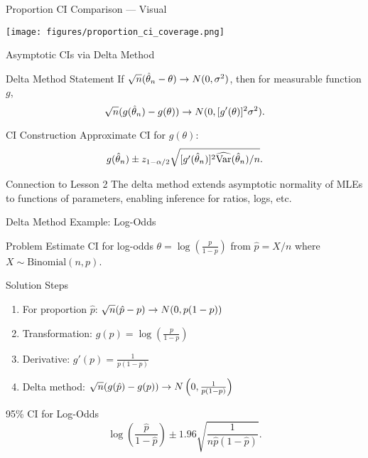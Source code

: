 \begin{frame}{Proportion CI Comparison --- Visual}
  \begin{center}
    \texttt{[image: figures/proportion\_ci\_coverage.png]}
  \end{center}
\end{frame}

\begin{frame}{Asymptotic CIs via Delta Method}
  \begin{block}{Delta Method Statement}
    If $\sqrt{n}(\hat{\theta}_n - \theta) \to N(0, \sigma^2)$, then
    for measurable function $g$,
    \[\sqrt{n}(g(\hat{\theta}_n) - g(\theta)) \to N(0, [g'(\theta)]^2 \sigma^2).\]
  \end{block}

  \begin{block}{CI Construction}
    Approximate CI for $g(\theta)$:
    \[g(\hat{\theta}_n) \pm z_{1-\alpha/2} \sqrt{[g'(\hat{\theta}_n)]^2 \widehat{\operatorname{Var}}(\hat{\theta}_n)/n}.\]
  \end{block}

  \begin{block}{Connection to Lesson 2}
    The delta method extends asymptotic normality of MLEs to functions
    of parameters, enabling inference for ratios, logs, etc.
  \end{block}
\end{frame}

\begin{frame}{Delta Method Example: Log-Odds}
  \begin{block}{Problem}
    Estimate CI for log-odds $\theta = \log\left(\frac{p}{1-p}\right)$ from $\hat{p} = X/n$ where $X \sim \text{Binomial}(n, p)$.
  \end{block}

  \begin{block}{Solution Steps}
    \begin{enumerate}
      \item For proportion $\hat{p}$: $\sqrt{n}(\hat{p} - p) \to N(0, p(1-p))$
      \item Transformation: $g(p) = \log\left(\frac{p}{1-p}\right)$
      \item Derivative: $g'(p) = \frac{1}{p(1-p)}$
      \item Delta method: $\sqrt{n}(g(\hat{p}) - g(p)) \to N\left(0, \frac{1}{p(1-p)}\right)$
    \end{enumerate}
  \end{block}

  \begin{block}{95\% CI for Log-Odds}
    \[\log\left(\frac{\hat{p}}{1-\hat{p}}\right) \pm 1.96 \sqrt{\frac{1}{n\hat{p}(1-\hat{p})}}.\]
  \end{block}
\end{frame}

